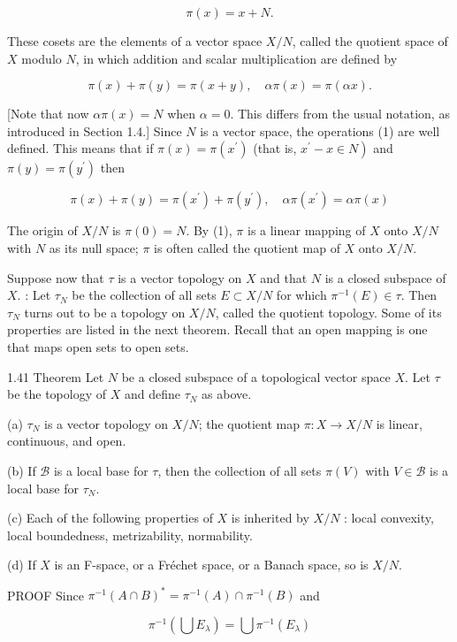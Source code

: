 \documentclass[10pt]{article}
\begin{document}
$$
\pi(x)=x+N .
$$

These cosets are the elements of a vector space $X / N$, called the quotient space of $X$ modulo $N$, in which addition and scalar multiplication are defined by

$$
\pi(x)+\pi(y)=\pi(x+y), \quad \alpha \pi(x)=\pi(\alpha x) .
$$

[Note that now $\alpha \pi(x)=N$ when $\alpha=0$. This differs from the usual notation, as introduced in Section 1.4.] Since $N$ is a vector space, the operations (1) are well defined. This means that if $\pi(x)=\pi\left(x^{\prime}\right)$ (that is, $\left.x^{\prime}-x \in N\right)$ and $\pi(y)=\pi\left(y^{\prime}\right)$ then

$$
\pi(x)+\pi(y)=\pi\left(x^{\prime}\right)+\pi\left(y^{\prime}\right), \quad \alpha \pi\left(x^{\prime}\right)=\alpha \pi(x)
$$

The origin of $X / N$ is $\pi(0)=N$. By (1), $\pi$ is a linear mapping of $X$ onto $X / N$ with $N$ as its null space; $\pi$ is often called the quotient map of $X$ onto $X / N$.

Suppose now that $\tau$ is a vector topology on $X$ and that $N$ is a closed subspace of $X$. : Let $\tau_{N}$ be the collection of all sets $E \subset X / N$ for which $\pi^{-1}(E) \in \tau$. Then $\tau_{N}$ turns out to be a topology on $X / N$, called the quotient topology. Some of its properties are listed in the next theorem. Recall that an open mapping is one that maps open sets to open sets.

1.41 Theorem Let $N$ be a closed subspace of a topological vector space $X$. Let $\tau$ be the topology of $X$ and define $\tau_{N}$ as above.

(a) $\tau_{N}$ is a vector topology on $X / N$; the quotient map $\pi: X \rightarrow X / N$ is linear, continuous, and open.

(b) If $\mathscr{B}$ is a local base for $\tau$, then the collection of all sets $\pi(V)$ with $V \in \mathscr{B}$ is a local base for $\tau_{N}$.

(c) Each of the following properties of $X$ is inherited by $X / N$ : local convexity, local boundedness, metrizability, normability.

(d) If $X$ is an F-space, or a Fréchet space, or a Banach space, so is $X / N$.

PROOF Since $\pi^{-1}(A \cap B)^{*}=\pi^{-1}(A) \cap \pi^{-1}(B)$ and

$$
\pi^{-1}\left(\bigcup E_{\lambda}\right)=\bigcup \pi^{-1}\left(E_{\lambda}\right)
$$
\end{document}
